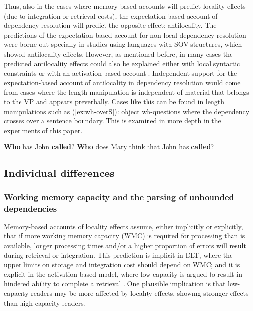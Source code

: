\documentclass{frontiersSCNS}\usepackage{knitr}
\begin{document}
Thus, also in the cases where memory-based accounts will predict locality effects (due to integration or retrieval costs), the expectation-based account of dependency resolution will predict the opposite effect: antilocality. The predictions of the expectation-based account for non-local dependency resolution were borne out specially in studies using languages with SOV structures, which showed antilocality effects. However, as mentioned before, in many cases the predicted antilocality effects could also be explained either with local syntactic constraints \citep{Konieczny2000} or with an activation-based account \citep{Vasishth2003,VasishthLewis2006}. Independent support for the expectation-based account of antilocality in dependency resolution would come from cases where the length manipulation is independent of material that belongs to the VP and appears preverbally. Cases like this can be found in length manipulations such as  (\ref{ex:wh-overS}): object wh-questions where the dependency crosses over a sentence boundary. This is examined in more depth in the experiments of this paper.

\begin{exe}
\ex  \label{ex:wh-overS}
\begin{xlist}
\ex \textbf{Who} has John \textbf{called}?
\ex \textbf{Who} does Mary think that John has \textbf{called}?
\end{xlist}

\end{exe}



 \subsection{Individual differences}
  \subsubsection{Working memory capacity and the parsing of unbounded dependencies}

Memory-based accounts of locality effects assume, either implicitly or explicitly, that if more working memory capacity (WMC) is required for processing than is available, longer processing times and/or a higher proportion of errors will result during retrieval or integration. This prediction is implicit in DLT, where the upper limits on storage and integration cost \citep{gibsonthomas99,Gibson2000} should depend on WMC; and it is explicit in the activation-based model, where low capacity is argued to result in hindered ability to complete a retrieval \citep{DailyEtAl2001}. One plausible implication is that low-capacity readers may be more affected by locality effects, showing stronger effects than high-capacity readers.
\end{document}
